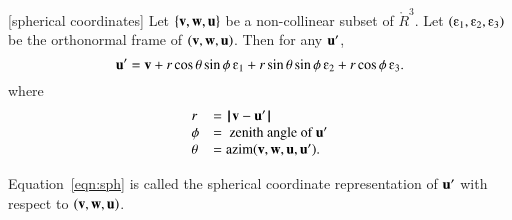 \begin{lemma}[spherical coordinates]\label{lemma:sph}
Let $\{{\mathbf v},{\mathbf w},{\mathbf u}\}$ %
be a non-collinear subset of $\ring{R}^3$.
Let $(\e_1,\e_2,\e_3)$ be the orthonormal frame of $({\mathbf v},{\mathbf w},{\mathbf u})$.
  Then for any ${\mathbf u}'$,
   \begin{equation}
   \u' = \v + r \cos\theta \sin\phi\, \e_1 + r \sin\theta\sin\phi\, \e_2 +
   r\cos\phi\,\e_3.
   \label{eqn:sph}
   \end{equation}
where
$$
\begin{array}{lll}
r &= {\hskip0.1em|\hskip-0.15em|\hskip0.1em}{\mathbf v}  -  {\mathbf u}'{\hskip0.1em|\hskip-0.15em|\hskip0.1em}\\
\phi &= \text{ zenith angle of } {\mathbf u}'\\
\theta &={\operatorname{azim}}({\mathbf v},{\mathbf w},{\mathbf u},{\mathbf u}').
\end{array}
$$
\end{lemma}
%
%
%
%
%
%

\begin{definition}\label{def:sph}
Equation~\ref{eqn:sph} is called the spherical coordinate representation of
${\mathbf u}'$ with respect to $({\mathbf v},{\mathbf w},{\mathbf u})$.   
\end{definition}
%
%
%
%


